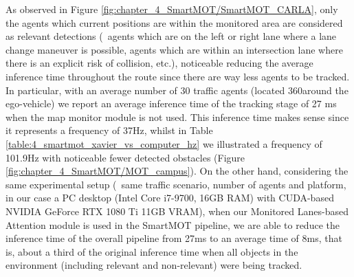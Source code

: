 As observed in Figure \ref{fig:chapter_4_SmartMOT/SmartMOT_CARLA}, only the agents which current positions are within the monitored area are considered as relevant detections (\ie \ agents which are on the left or right lane where a lane change maneuver is possible, agents which are within an intersection lane where there is an explicit risk of collision, etc.), noticeable reducing the average inference time throughout the route since there are way less agents to be tracked. In particular, with an average number of 30 traffic agents (located 360\degree around the ego-vehicle) we report an average inference time of the tracking stage of 27 ms when the map monitor module is not used. This inference time makes sense since it represents a frequency of 37Hz, whilst in Table \ref{table:4_smartmot_xavier_vs_computer_hz} we illustrated a frequency of 101.9Hz with noticeable fewer detected obstacles (Figure \ref{fig:chapter_4_SmartMOT/MOT_campus}). On the other hand, considering the same experimental setup (\ie \ same traffic scenario, number of agents and platform, in our case a PC desktop (Intel Core i7-9700, 16GB RAM) with CUDA-based NVIDIA GeForce RTX 1080 Ti 11GB VRAM), when our Monitored Lanes-based Attention module is used in the SmartMOT pipeline, we are able to reduce the inference time of the overall pipeline from 27ms to an average time of 8ms, that is, about a third of the original inference time when all objects in the environment (including relevant and non-relevant) were being tracked. 

